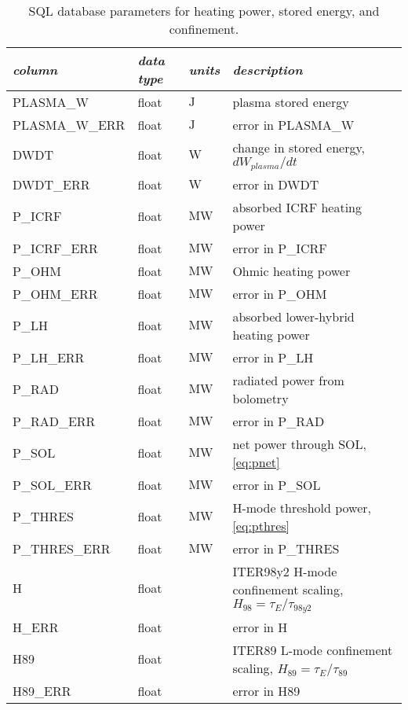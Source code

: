  \begin{longtabu} to 150mm {X[2.348,l]X[1,c]X[1,c]X[4.348,c]}
 \caption{SQL database parameters for heating power, stored energy, and confinement.}\label{tab:sql_power} \\

 \toprule
 \emph{column} &
 \emph{data type} &
 \emph{units} &
 \emph{description}
 \\
 \midrule
 \endfirsthead
 \endhead

 \endfoot
 \bottomrule
 \endlastfoot

 PLASMA\_W &
 float &
 $\si{\joule}$ &
 plasma stored energy
 \\
 PLASMA\_W\_ERR &
 float &
 $\si{\joule}$ &
 error in PLASMA\_W
 \\
 DWDT &
 float &
 $\si{\watt}$ &
 change in stored energy, $dW_{plasma}/dt$
 \\
 DWDT\_ERR &
 float &
 $\si{\watt}$ &
 error in DWDT
 \\
 P\_ICRF &
 float &
 $\si{\mega\watt}$ &
 absorbed ICRF heating power
 \\
 P\_ICRF\_ERR &
 float &
 $\si{\mega\watt}$ &
 error in P\_ICRF
 \\
 P\_OHM &
 float &
 $\si{\mega\watt}$ &
 Ohmic heating power
 \\
 P\_OHM\_ERR &
 float &
 $\si{\mega\watt}$ &
 error in P\_OHM
 \\
 P\_LH &
 float &
 $\si{\mega\watt}$ &
 absorbed lower-hybrid heating power
 \\
 P\_LH\_ERR &
 float &
 $\si{\mega\watt}$ &
 error in P\_LH
 \\
 P\_RAD &
 float &
 $\si{\mega\watt}$ &
 radiated power from bolometry
 \\
 P\_RAD\_ERR &
 float &
 $\si{\mega\watt}$ &
 error in P\_RAD
 \\
 P\_SOL &
 float &
 $\si{\mega\watt}$ &
 net power through SOL, \cref{eq:pnet}
 \\
 P\_SOL\_ERR &
 float &
 $\si{\mega\watt}$ &
 error in P\_SOL
 \\
 P\_THRES &
 float &
 $\si{\mega\watt}$ &
 H-mode threshold power, \cref{eq:pthres}
 \\
 P\_THRES\_ERR &
 float &
 $\si{\mega\watt}$ &
 error in P\_THRES
 \\
 H &
 float &
 &
 ITER98y2 H-mode confinement scaling, $H_{98} = \tau_E / \tau_{98y2}$
 \\
 H\_ERR &
 float &
 &
 error in H
 \\
 H89 &
 float &
 &
 ITER89 L-mode confinement scaling, $H_{89} = \tau_E / \tau_{89}$
 \\
 H89\_ERR &
 float &
 &
 error in H89
 \\

 \end{longtabu}

